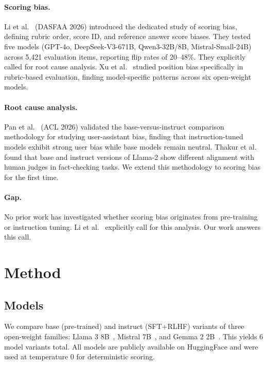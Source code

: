 \documentclass[11pt,twocolumn]{article}
\begin{document}
\paragraph{Scoring bias.}
Li et al.~\cite{li2025scoring} (DASFAA 2026) introduced the dedicated study of scoring bias, defining rubric order, score ID, and reference answer score biases. They tested five models (GPT-4o, DeepSeek-V3-671B, Qwen3-32B/8B, Mistral-Small-24B) across 5,421 evaluation items, reporting flip rates of 20--48\%. They explicitly called for root cause analysis. Xu et al.~\cite{xu2026position} studied position bias specifically in rubric-based evaluation, finding model-specific patterns across six open-weight models.

\paragraph{Root cause analysis.}
Pan et al.~\cite{pan2025user} (ACL 2026) validated the base-versus-instruct comparison methodology for studying user-assistant bias, finding that instruction-tuned models exhibit strong user bias while base models remain neutral. Thakur et al.~\cite{thakur2024judging} found that base and instruct versions of Llama-2 show different alignment with human judges in fact-checking tasks. We extend this methodology to scoring bias for the first time.

\paragraph{Gap.}
No prior work has investigated whether scoring bias originates from pre-training or instruction tuning. Li et al.~\cite{li2025scoring} explicitly call for this analysis. Our work answers this call.

\section{Method}

\subsection{Models}
We compare base (pre-trained) and instruct (SFT+RLHF) variants of three open-weight families: Llama 3 8B~\cite{llama3}, Mistral 7B~\cite{mistral}, and Gemma 2 2B~\cite{gemma2}. This yields 6 model variants total. All models are publicly available on HuggingFace and were used at temperature 0 for deterministic scoring.
\end{document}
